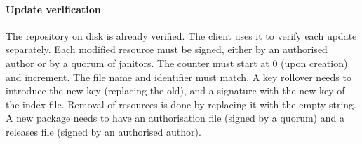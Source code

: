 \documentclass[nocopyrightspace]{sigplanconf}
\begin{document}
\paragraph{Update verification}  The repository on disk is already verified.
The client uses it to verify each update separately.
Each modified resource must be signed, either by an authorised author or by a quorum of janitors.
The counter must start at 0 (upon creation) and increment.
The file name and identifier must match.
A key rollover needs to introduce the new key (replacing the old), and a signature with the new key of the index file.
Removal of resources is done by replacing it with the empty string.
A new package needs to have an authorisation file (signed by a quorum) and a releases file (signed by an authorised author).
\end{document}
